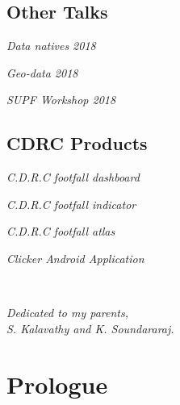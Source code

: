 \section*{Other Talks}
  \par {}\hspace{1.5em}
  \textit{Data natives 2018}
  \vspace{0.25cm} \par {}\hspace{1.5em}
  \textit{Geo-data 2018}
  \vspace{0.25cm} \par {}\hspace{1.5em}
  \textit{SUPF Workshop 2018}
\section*{CDRC Products}
  \par {}\hspace{1.5em}
  \textit{C.D.R.C footfall dashboard}
  \vspace{0.25cm} \par {}\hspace{1.5em}
  \textit{C.D.R.C footfall indicator}
  \vspace{0.25cm} \par {}\hspace{1.5em}
  \textit{C.D.R.C footfall atlas}
  \vspace{0.25cm} \par {}\hspace{1.5em}
  \textit{Clicker Android Application}


\cleardoublepage
~\vfill
\begin{doublespace}
\noindent\fontsize{14}{16}\selectfont\itshape
\nohyphenation
\noindent Dedicated to my parents,\\
\noindent S. Kalavathy and K. Soundararaj.
\end{doublespace}
\vfill
\vfill


\chapter*{Prologue}
